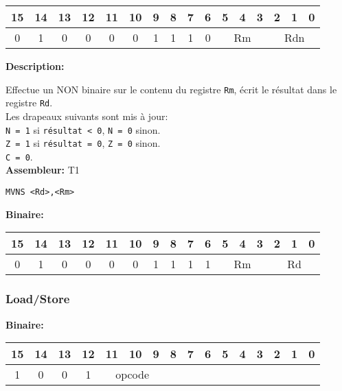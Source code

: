 \documentclass{article}
\begin{document}
    \begin{tabular}{| c c c c c c c c c c c c c c c c |}
        \hline
        15 & 14 & 13 & 12 & 11 & 10 & \multicolumn{1}{|c}{9} & 8 & 7 & 6 & \multicolumn{1}{|c}{5} & 4 & 3 & \multicolumn{1}{|c}{2} & 1 & 0 \\
        \hline
        0 & 1 & 0 & 0 & 0 & 0 & \multicolumn{1}{|c}{1} & 1 & 1 & 0 & \multicolumn{3}{|c}{Rm} & \multicolumn{3}{|c|}{Rdn} \\
        \hline
    \end{tabular}



    \textbf{Description: }

    Effectue un NON binaire sur le contenu du registre \texttt{Rm}, écrit le résultat dans le registre \texttt{Rd}.\\
    Les drapeaux suivants sont mis à jour:\\
    \texttt{N = 1} si \texttt{résultat < 0}, \texttt{N = 0} sinon.\\
    \texttt{Z = 1} si \texttt{résultat = 0}, \texttt{Z = 0} sinon.\\
    \texttt{C = 0}.\\

    \textbf{Assembleur:} T1

    \begin{lstlisting}
MVNS <Rd>,<Rm>
    \end{lstlisting}

    \textbf{Binaire:}

    \begin{tabular}{| c c c c c c c c c c c c c c c c |}
        \hline
        15 & 14 & 13 & 12 & 11 & 10 & \multicolumn{1}{|c}{9} & 8 & 7 & 6 & \multicolumn{1}{|c}{5} & 4 & 3 & \multicolumn{1}{|c}{2} & 1 & 0 \\
        \hline
        0 & 1 & 0 & 0 & 0 & 0 & \multicolumn{1}{|c}{1} & 1 & 1 & 1 & \multicolumn{3}{|c}{Rm} & \multicolumn{3}{|c|}{Rd} \\
        \hline
    \end{tabular}

    \subsubsection{Load/Store}
    \label{subsubsec:LoadStore}

    \textbf{Binaire:}

    \begin{tabular}{| c c c c c c c c c c c c c c c c |}
        \hline
        15 & 14 & 13 & 12 & \multicolumn{1}{|c}{11} & 10 & 9 & \multicolumn{1}{|c}{8} & 7 & 6 & 5 & 4 & 3 & 2 & 1 & 0 \\
        \hline
        1 & 0 & 0 & 1 & \multicolumn{3}{|c}{opcode} & \multicolumn{9}{|c|}{} \\
        \hline
    \end{tabular}
\end{document}
